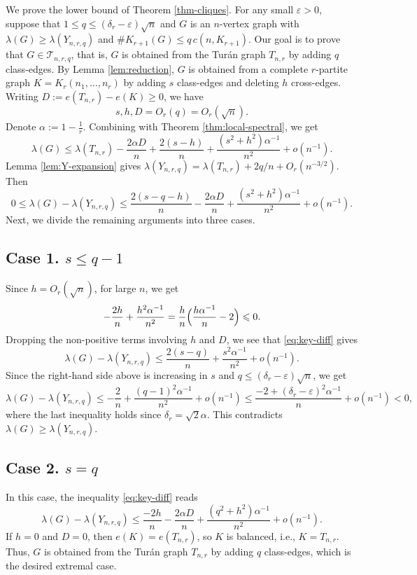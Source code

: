 \documentclass[11pt,a4paper]{article}
\theoremstyle{definition}
\theoremstyle{plain}
\renewcommand{\le}{\leqslant}
\renewcommand{\ge}{\geqslant}
\begin{document}
We prove the lower bound of Theorem \ref{thm-cliques}. 
For any small $\varepsilon >0$, suppose that $1\le q\le(\delta_r-\varepsilon)\sqrt n$ and $G$  is an $n$-vertex graph with 
$\lambda(G)\ge\lambda(Y_{n,r,q})$ and $\texttt{\#} K_{r+1}(G)\le q\,c(n,K_{r+1})$. Our goal is to prove that $G\in \mathcal{T}_{n,r,q}$, that is, $G$ is obtained from the Tur\'{a}n graph $T_{n,r}$ by adding $q$ class-edges.   
By Lemma \ref{lem:reduction}, $G$ is obtained from 
a complete $r$-partite graph $K=K_r(n_1,\ldots,n_r)$ by adding $s$ class-edges and deleting $h$ cross-edges. Writing
$D:=e(T_{n,r})-e(K)\ge 0$, we have 
\[
        s,h,D=O_r(q)=O_r(\sqrt n).
\]
Denote $\alpha:=1- \frac{1}{r}$. 
Combining with Theorem \ref{thm:local-spectral}, 
we get  
   \[     \lambda(G)\le \lambda(T_{n,r})-\frac{2\alpha D}{n}+\frac{2(s-h)}{n}
        +\frac{(s^2+h^2)\alpha^{-1}}{n^2}+o(n^{-1}). \]  
Lemma \ref{lem:Y-expansion} gives
$\lambda(Y_{n,r,q})=\lambda(T_{n,r})+2q/n+O_r(n^{-3/2})$. Then 
\begin{equation}      
\label{eq:key-diff}
        0\le \lambda(G)-\lambda(Y_{n,r,q})
        \le \frac{2(s-q-h)}{n}-\frac{2\alpha D}{n}
            +\frac{(s^2+h^2)\alpha^{-1}}{n^2}+o(n^{-1}). 
\end{equation} 
Next, we divide the remaining arguments into three cases. 

\subsection*{Case 1. $s\le q-1$}
Since $h=O_r(\sqrt n)$, for large $n$, we get 
\[
        -\frac{2h}{n}+\frac{h^2 \alpha^{-1}}{n^2}=\frac hn 
        \Bigl(\frac{h\alpha^{-1}}{n}-2\Bigr)\le 0.
\]
Dropping the non-positive terms involving $h$ and $D$, we see that \eqref{eq:key-diff} gives
$$ \lambda(G)-\lambda(Y_{n,r,q})\le 
\frac{2(s-q)}{n} + \frac{s^2\alpha^{-1}}{n^2}+ o(n^{-1}). $$ 
Since the right-hand side above is increasing in
$s$ and $q\le (\delta_r -\varepsilon)\sqrt{n}$, we get 
\[
        \lambda(G)-\lambda(Y_{n,r,q})
        \le -\frac2n+\frac{(q-1)^2 \alpha^{-1}}{n^2}+o(n^{-1})
        \le \frac{-2 + (\delta_r- \varepsilon)^2 \alpha^{-1}}{n} + o(n^{-1})<0, 
\]
where the last inequality holds since $\delta_r= \sqrt{2}\alpha$. This contradicts $\lambda(G)\ge\lambda(Y_{n,r,q})$.

\subsection*{Case 2. $s=q$}
In this case, the inequality \eqref{eq:key-diff} reads
$$
\lambda(G)-\lambda(Y_{n,r,q})\le \frac{-2h}{n} - \frac{2\alpha D}{n}+\frac{(q^2+h^2)\alpha^{-1}}{n^2}+o(n^{-1}). $$
If $h=0$ and $D=0$, then $e(K)=e(T_{n,r})$, so $K$ is balanced, i.e., $K=T_{n,r}$. Thus, $G$ is obtained from the Tur\'{a}n graph  $T_{n,r}$ by adding $q$  class-edges, which is the desired extremal case. 
\end{document}

